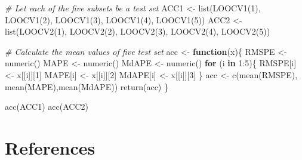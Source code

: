 \documentclass[12pt,oneside]{reedthesis}
\newenvironment{Shaded}{\begin{snugshade}}{\end{snugshade}}
\newcommand{\CommentTok}[1]{\textcolor[rgb]{0.56,0.35,0.01}{\textit{#1}}}
\newcommand{\ControlFlowTok}[1]{\textcolor[rgb]{0.13,0.29,0.53}{\textbf{#1}}}
\newcommand{\DecValTok}[1]{\textcolor[rgb]{0.00,0.00,0.81}{#1}}
\newcommand{\FunctionTok}[1]{\textcolor[rgb]{0.00,0.00,0.00}{#1}}
\newcommand{\NormalTok}[1]{#1}
\newcommand{\OtherTok}[1]{\textcolor[rgb]{0.56,0.35,0.01}{#1}}
\newcommand{\SpecialCharTok}[1]{\textcolor[rgb]{0.00,0.00,0.00}{#1}}
\begin{document}
\begin{Shaded}
\begin{Highlighting}[]
\CommentTok{\# Let each of the five subsets be a test set}
\NormalTok{ACC1 }\OtherTok{\textless{}{-}} \FunctionTok{list}\NormalTok{(}\FunctionTok{LOOCV1}\NormalTok{(}\DecValTok{1}\NormalTok{), }\FunctionTok{LOOCV1}\NormalTok{(}\DecValTok{2}\NormalTok{), }\FunctionTok{LOOCV1}\NormalTok{(}\DecValTok{3}\NormalTok{), }\FunctionTok{LOOCV1}\NormalTok{(}\DecValTok{4}\NormalTok{), }\FunctionTok{LOOCV1}\NormalTok{(}\DecValTok{5}\NormalTok{))}
\NormalTok{ACC2 }\OtherTok{\textless{}{-}} \FunctionTok{list}\NormalTok{(}\FunctionTok{LOOCV2}\NormalTok{(}\DecValTok{1}\NormalTok{), }\FunctionTok{LOOCV2}\NormalTok{(}\DecValTok{2}\NormalTok{), }\FunctionTok{LOOCV2}\NormalTok{(}\DecValTok{3}\NormalTok{), }\FunctionTok{LOOCV2}\NormalTok{(}\DecValTok{4}\NormalTok{), }\FunctionTok{LOOCV2}\NormalTok{(}\DecValTok{5}\NormalTok{))}

\CommentTok{\# Calculate the mean values of five test set}
\NormalTok{acc }\OtherTok{\textless{}{-}} \ControlFlowTok{function}\NormalTok{(x)\{}
\NormalTok{  RMSPE }\OtherTok{\textless{}{-}} \FunctionTok{numeric}\NormalTok{()}
\NormalTok{  MAPE }\OtherTok{\textless{}{-}} \FunctionTok{numeric}\NormalTok{()}
\NormalTok{  MdAPE }\OtherTok{\textless{}{-}} \FunctionTok{numeric}\NormalTok{()}
  \ControlFlowTok{for}\NormalTok{ (i }\ControlFlowTok{in} \DecValTok{1}\SpecialCharTok{:}\DecValTok{5}\NormalTok{)\{}
\NormalTok{    RMSPE[i] }\OtherTok{\textless{}{-}}\NormalTok{  x[[i]][}\DecValTok{1}\NormalTok{]}
\NormalTok{    MAPE[i] }\OtherTok{\textless{}{-}}\NormalTok{ x[[i]][}\DecValTok{2}\NormalTok{]}
\NormalTok{    MdAPE[i] }\OtherTok{\textless{}{-}}\NormalTok{ x[[i]][}\DecValTok{3}\NormalTok{]}
\NormalTok{  \}}
\NormalTok{  acc }\OtherTok{\textless{}{-}} \FunctionTok{c}\NormalTok{(}\FunctionTok{mean}\NormalTok{(RMSPE), }\FunctionTok{mean}\NormalTok{(MAPE),}\FunctionTok{mean}\NormalTok{(MdAPE))}
  \FunctionTok{return}\NormalTok{(acc)}
\NormalTok{\}}

\FunctionTok{acc}\NormalTok{(ACC1)}
\FunctionTok{acc}\NormalTok{(ACC2)}
\end{Highlighting}
\end{Shaded}
\backmatter

\hypertarget{references}{%
\chapter*{References}\label{references}}


\noindent
\end{document}
